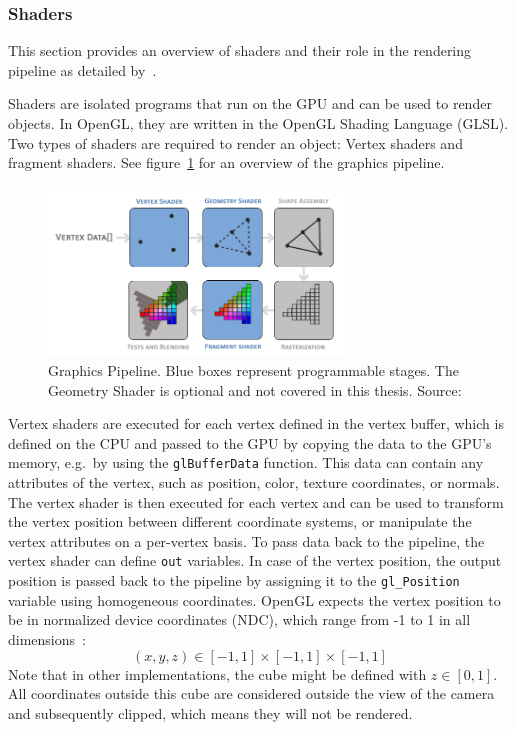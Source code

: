 
\subsubsection{Shaders}\label{subsec:shaders}

This section provides an overview of shaders and their role in the rendering pipeline as detailed by~\cite{de_vries_learn_2020}.

Shaders are isolated programs that run on the GPU and can be used to render objects.
In OpenGL, they are written in the OpenGL Shading Language (GLSL).
Two types of shaders are required to render an object: Vertex shaders and fragment shaders.
See figure~\ref{fig:graphics-pipeline} for an overview of the graphics pipeline.
\begin{figure}[h!]
    \centering
    \includegraphics[width=0.70\textwidth]{images/graphics-pipeline}
    \caption{Graphics Pipeline. Blue boxes represent programmable stages. The Geometry Shader is optional and not covered in this thesis. Source:~\cite{de_vries_learn_2020}}
    \label{fig:graphics-pipeline}
\end{figure}

Vertex shaders are executed for each vertex defined in the vertex buffer, which is defined on the CPU and
passed to the GPU by copying the data to the GPU's memory, e.g.\ by using the \texttt{glBufferData} function.
This data can contain any attributes of the vertex, such as position, color, texture coordinates, or normals.
The vertex shader is then executed for each vertex and can be used to transform the vertex position between different coordinate systems,
or manipulate the vertex attributes on a per-vertex basis.
To pass data back to the pipeline, the vertex shader can define \texttt{out} variables.
In case of the vertex position, the output position is passed back to the
pipeline by assigning it to the \texttt{gl\_Position} variable using homogeneous coordinates.
OpenGL expects the vertex position to be in normalized device coordinates (NDC),
which range from -1 to 1 in all dimensions~\cite{dorner_virtual_2019}:
\begin{equation}
    (x, y, z) \in [-1, 1] \times [-1, 1] \times [-1, 1]
\end{equation}
Note that in other implementations, the cube might be defined with $z \in [0, 1]$.
All coordinates outside this cube are considered outside the view of the camera and subsequently clipped,
which means they will not be rendered.

